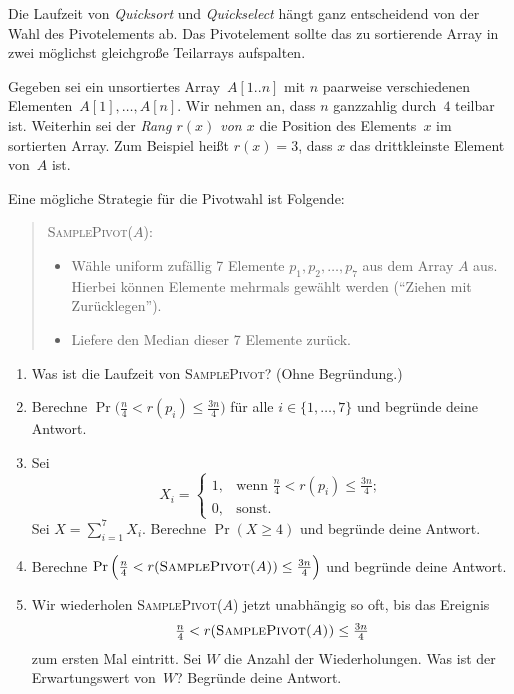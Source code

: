 \documentclass{uebung_cs}
\begin{document}
\begin{aufgabe}
	Die Laufzeit von \textit{Quicksort} und \textit{Quickselect} hängt ganz entscheidend von der Wahl des Pivotelements ab.
	Das Pivotelement sollte das zu sortierende Array in zwei möglichst gleichgroße Teilarrays aufspalten.

	Gegeben sei ein unsortiertes Array~$A[1..n]$ mit $n$ paarweise verschiedenen Elementen~$A[1], \dots, A[n]$. Wir nehmen an, dass $n$ ganzzahlig durch~$4$ teilbar ist.
	Weiterhin sei der \emph{Rang $r(x)$ von $x$} die Position des Elements~$x$ im sortierten Array. Zum Beispiel heißt $r(x)=3$, dass $x$ das drittkleinste Element von~$A$ ist.

	Eine mögliche Strategie für die Pivotwahl ist Folgende:

	\begin{quote}
		\textsc{SamplePivot($A$):}
		\begin{itemize}
			\item Wähle uniform zufällig 7 Elemente $p_1,p_2,\dots,p_7$ aus dem Array $A$ aus. Hierbei können Elemente mehrmals gewählt werden (\enquote{Ziehen mit Zurücklegen}).
			\item Liefere den Median dieser 7 Elemente zurück.
		\end{itemize}
	\end{quote}
	\begin{enumerate}
		\item Was ist die Laufzeit von \textsc{SamplePivot}? (Ohne Begründung.)
		\item Berechne $\Pr\Big(\frac{n}{4}<r(p_i)\le\frac{3n}{4}\Big)$ für alle $i\in\{1,\dots,7\}$ und begründe deine Antwort.
		\item Sei
		\[X_i=
		\begin{cases}
			1,&\text{wenn }
			\frac{n}{4}<r(p_i)\le\frac{3n}{4};\\
			0,&\text{sonst.}
		\end{cases}
		\]
		Sei $X=\sum_{i=1}^7 X_i$.
		Berechne $\Pr\left(X\ge 4\right)$ und begründe deine Antwort.
		\item Berechne $\Pr\Big(\frac{n}{4}<r(\text{\textsc{SamplePivot($A$)}})\le\frac{3n}{4}\Big)$ und begründe deine Antwort.
		\item Wir wiederholen \textsc{SamplePivot($A$)} jetzt unabhängig so oft, bis das Ereignis \[\tfrac{n}{4}<r(\text{\textsc{SamplePivot($A$))}}\le\tfrac{3n}{4}\] zum ersten Mal eintritt. Sei $W$ die Anzahl der Wiederholungen. Was ist der Erwartungswert von~$W$? Begründe deine Antwort.
	\end{enumerate}
\end{aufgabe}
\end{document}
